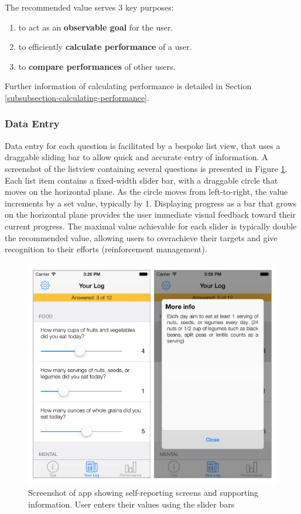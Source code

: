 The recommended value serves 3 key purposes:
\begin{enumerate}[noitemsep,topsep=0pt]
\item to act as an \textbf{observable goal} for the user.
\item to efficiently \textbf{calculate performance} of a user.
\item to \textbf{compare performances} of other users.
\end{enumerate}

Further information of calculating performance is detailed in Section \ref{subsubsection-calculating-performance}.

\subsubsection{Data Entry}
Data entry for each question is facilitated by a bespoke list view, that uses a draggable sliding bar to allow quick and accurate entry of information. A screenshot of the listview containing several questions is presented in Figure \ref{fig: screenshot-measure}. Each list item contains a fixed-width slider bar, with a draggable circle that moves on the horizontal plane. As the circle moves from left-to-right, the value increments by a set value, typically by 1. Displaying progress as a bar that grows on the horizontal plane provides the user immediate visual feedback toward their current progress. The maximal value achievable for each slider is typically double the recommended value, allowing users to overachieve their targets and give recognition to their efforts (reinforcement management).

\begin{figure}[h]
    \centering
    \includegraphics[scale=0.25, angle=0]{Files/prevention-study-1/figures/screenshot-measure.png}
    \caption{Screenshot of app showing self-reporting screens and supporting information. User enters their values using the slider bars}
    \label{fig: screenshot-measure}
\end{figure}

